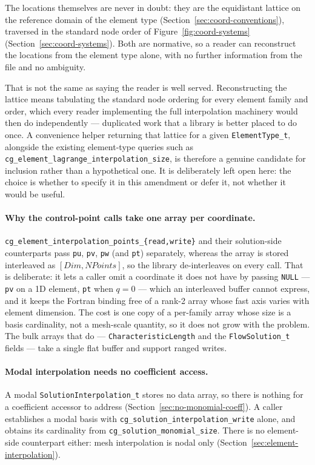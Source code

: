 \documentclass[11pt,letterpaper]{article}
\newif\ifvfourdraft
\newcommand{\vfourmark}{\ifvfourdraft\textcolor{v4violet}{\textbf{[v4]}}\ \fi}
\begin{document}
The locations themselves are never in doubt: they are the equidistant lattice on the reference
domain of the element type (Section~\ref{sec:coord-conventions}), traversed in the standard node
order of Figure~\ref{fig:coord-systems} (Section~\ref{sec:coord-systems}).  Both are normative,
so a reader can reconstruct the locations from the element type alone, with no further
information from the file and no ambiguity.

That is not the same as saying the reader is well served.  Reconstructing the lattice means
tabulating the standard node ordering for every element family and order, which every reader
implementing the full interpolation machinery would then do independently --- duplicated work
that a library is better placed to do once.  A convenience helper returning that lattice for a
given \texttt{ElementType\_t}, alongside the existing element-type queries such as
\texttt{cg\_element\_lagrange\_interpolation\_size}, is therefore a genuine candidate for
inclusion rather than a hypothetical one.  It is deliberately left open here: the choice is
whether to specify it in this amendment or defer it, not whether it would be useful.

\paragraph{\vfourmark Why the control-point calls take one array per coordinate.}
\texttt{cg\_element\_interpolation\_points\_\{read,write\}} and their solution-side
counterparts pass \texttt{pu}, \texttt{pv}, \texttt{pw} (and \texttt{pt})
separately, whereas the array is stored interleaved as
$[\textit{Dim}, \textit{NPoints}]$, so the library de-interleaves on every call.
That is deliberate: it lets a caller omit a coordinate it does not have by
passing \texttt{NULL} --- \texttt{pv} on a 1D element, \texttt{pt} when $q=0$ ---
which an interleaved buffer cannot express, and it keeps the Fortran binding free
of a rank-2 array whose fast axis varies with element dimension.  The cost is one
copy of a per-family array whose size is a basis cardinality, not a mesh-scale
quantity, so it does not grow with the problem.  The bulk arrays that do ---
\texttt{CharacteristicLength} and the \texttt{FlowSolution\_t} fields --- take a
single flat buffer and support ranged writes.

\paragraph{\vfourmark Modal interpolation needs no coefficient access.}
A modal \texttt{SolutionInterpolation\_t} stores no data array, so there is nothing
for a coefficient accessor to address (Section~\ref{sec:no-monomial-coeff}).  A
caller establishes a modal basis with \texttt{cg\_solution\_interpolation\_write}
alone, and obtains its cardinality from \texttt{cg\_solution\_monomial\_size}.
There is no element-side counterpart either: mesh interpolation is nodal only
(Section~\ref{sec:element-interpolation}).
\end{document}
